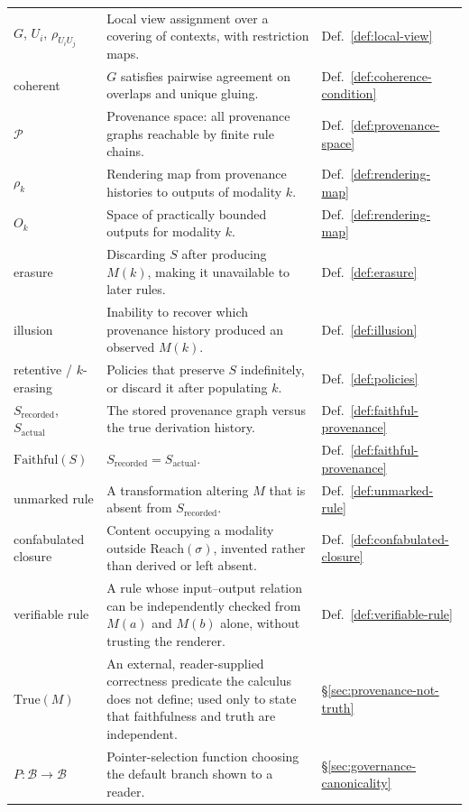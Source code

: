 \documentclass[11pt]{article}
\theoremstyle{definition}
\begin{document}
\begin{longtable}{@{}p{}p{}p{}@{}}
$G$, $U_i$, $\rho_{U_iU_j}$ & Local view assignment over a covering of contexts, with restriction maps. & Def.~\ref{def:local-view} \\
coherent & $G$ satisfies pairwise agreement on overlaps and unique gluing. & Def.~\ref{def:coherence-condition} \\
$\mathcal{P}$ & Provenance space: all provenance graphs reachable by finite rule chains. & Def.~\ref{def:provenance-space} \\
$\rho_k$ & Rendering map from provenance histories to outputs of modality $k$. & Def.~\ref{def:rendering-map} \\
$O_k$ & Space of practically bounded outputs for modality $k$. & Def.~\ref{def:rendering-map} \\
erasure & Discarding $S$ after producing $M(k)$, making it unavailable to later rules. & Def.~\ref{def:erasure} \\
illusion & Inability to recover which provenance history produced an observed $M(k)$. & Def.~\ref{def:illusion} \\
retentive / $k$-erasing & Policies that preserve $S$ indefinitely, or discard it after populating $k$. & Def.~\ref{def:policies} \\
$S_{\mathrm{recorded}}$, $S_{\mathrm{actual}}$ & The stored provenance graph versus the true derivation history. & Def.~\ref{def:faithful-provenance} \\
$\mathrm{Faithful}(S)$ & $S_{\mathrm{recorded}} = S_{\mathrm{actual}}$. & Def.~\ref{def:faithful-provenance} \\
unmarked rule & A transformation altering $M$ that is absent from $S_{\mathrm{recorded}}$. & Def.~\ref{def:unmarked-rule} \\
confabulated closure & Content occupying a modality outside $\mathrm{Reach}(\sigma)$, invented rather than derived or left absent. & Def.~\ref{def:confabulated-closure} \\
verifiable rule & A rule whose input--output relation can be independently checked from $M(a)$ and $M(b)$ alone, without trusting the renderer. & Def.~\ref{def:verifiable-rule} \\
$\mathrm{True}(M)$ & An external, reader-supplied correctness predicate the calculus does not define; used only to state that faithfulness and truth are independent. & \S\ref{sec:provenance-not-truth} \\
$P : \mathcal{B} \to \mathcal{B}$ & Pointer-selection function choosing the default branch shown to a reader. & \S\ref{sec:governance-canonicality} \\

\end{longtable}
\end{document}
